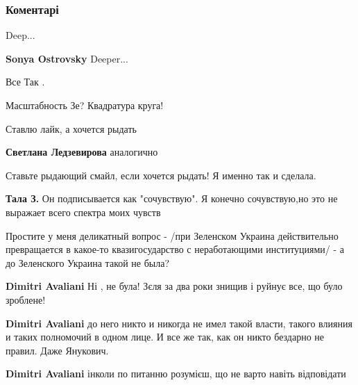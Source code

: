  
 
 
 
 
\subsubsection{Коментарі}

\begin{itemize} %
Deep...

\textbf{Sonya Ostrovsky} Deeper...

Все Так .

Масштабность Зе? Квадратура круга!

Ставлю лайк, а хочется рыдать

\begin{itemize} %
\textbf{Светлана Ледзевирова} аналогично

Ставьте рыдающий смайл, если хочется рыдать!
Я именно так и сделала.

\textbf{Тала З.} Он подписывается как "сочувствую". Я конечно сочувствую,но это не выражает всего спектра моих чувств
\end{itemize} %


Простите у меня деликатный вопрос - /при Зеленском Украина действительно
превращается в какое-то квазигосударство с неработающими институциями/ - а до
Зеленского Украина такой не была?

\begin{itemize} %
\textbf{Dimitri Avaliani} Ні , не була! Зєля за два роки знищив і руйнує все, що було зроблене!

\textbf{Dimitri Avaliani} до него никто и никогда не имел такой власти, такого влияния и таких полномочий в одном лице. И все же так, как он никто бездарно не правил. Даже Янукович.

\textbf{Dimitri Avaliani} інколи по питанню розумієш, що не варто навіть відповідати


\end{itemize}
\end{itemize}

